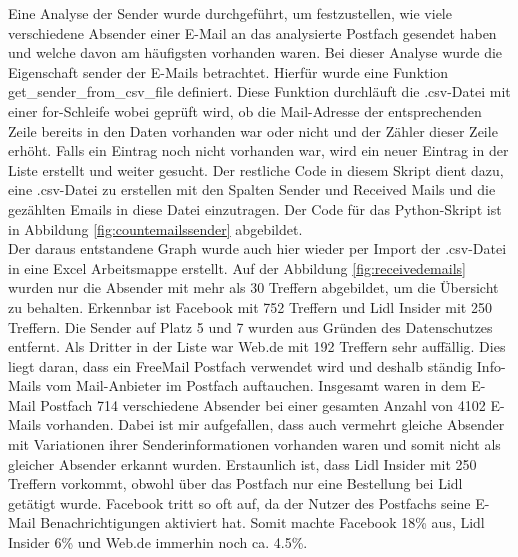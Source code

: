Eine Analyse der Sender wurde durchgeführt, um festzustellen, wie viele verschiedene Absender einer E-Mail an das analysierte Postfach gesendet haben und welche davon am häufigsten vorhanden waren. Bei dieser Analyse wurde die Eigenschaft \glqq{}sender\grqq{} der E-Mails betrachtet. Hierfür wurde eine Funktion \glqq{}get\_sender\_from\_csv\_file\grqq{} definiert. Diese Funktion durchläuft die .csv-Datei mit einer for-Schleife wobei geprüft wird, ob die Mail-Adresse der entsprechenden Zeile bereits in den Daten vorhanden war oder nicht und der Zähler dieser Zeile erhöht. Falls ein Eintrag noch nicht vorhanden war, wird ein neuer Eintrag in der Liste erstellt und weiter gesucht. Der restliche Code in diesem Skript dient dazu, eine .csv-Datei zu erstellen mit den Spalten \glqq{}Sender\grqq{} und \glqq{}Received Mails\grqq{} und die gezählten Emails in diese Datei einzutragen. Der Code für das Python-Skript ist in Abbildung \ref{fig:countemailssender} abgebildet. \\


Der daraus entstandene Graph wurde auch hier wieder per Import der .csv-Datei in eine Excel Arbeitsmappe erstellt. Auf der Abbildung \ref{fig:receivedemails} wurden nur die Absender mit mehr als 30 Treffern abgebildet, um die Übersicht zu behalten. Erkennbar ist Facebook mit 752 Treffern und Lidl Insider mit 250 Treffern. Die Sender auf Platz 5 und 7 wurden aus Gründen des Datenschutzes entfernt. Als Dritter in der Liste war Web.de mit 192 Treffern sehr auffällig. Dies liegt daran, dass ein FreeMail Postfach verwendet wird und deshalb ständig \glqq{}Info-Mails\grqq{} vom Mail-Anbieter im Postfach auftauchen. Insgesamt waren in dem E-Mail Postfach 714 verschiedene Absender bei einer gesamten Anzahl von 4102 E-Mails vorhanden. Dabei ist mir aufgefallen, dass auch vermehrt gleiche Absender mit Variationen ihrer Senderinformationen vorhanden waren und somit nicht als gleicher Absender erkannt wurden. Erstaunlich ist, dass Lidl Insider mit 250 Treffern vorkommt, obwohl über das Postfach nur eine Bestellung bei Lidl getätigt wurde. Facebook tritt so oft auf, da der Nutzer des Postfachs seine E-Mail Benachrichtigungen aktiviert hat. Somit machte Facebook 18\% aus, Lidl Insider 6\% und Web.de immerhin noch ca. 4.5\%. \\


